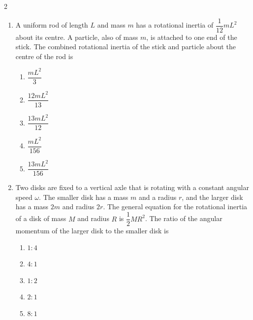 {\begin{multicols}{2}
\begin{enumerate}[leftmargin=12pt,itemsep=6pt]
    \item A uniform rod of length $L$ and mass $m$ has a rotational inertia
      of $\dfrac1{12}mL^2$ about its centre. A particle, also of mass $m$, is
      attached to one end of the stick. The combined rotational inertia of the
      stick and particle about the centre of the rod is
      \begin{center}
      \end{center}
      \begin{enumerate}
      \item$\dfrac{mL^2}3$
      \item$\dfrac{12mL^2}{13}$
      \item$\dfrac{13mL^2}{12}$
      \item$\dfrac{mL^2}{156}$
      \item$\dfrac{13mL^2}{156}$
      \end{enumerate}
    
    \item Two disks are fixed to a vertical axle that is rotating with a
      constant angular speed $\omega$. The smaller disk has a mass $m$ and a
      radius $r$, and the larger disk has a mass $2m$ and radius $2r$. The
      general equation for the rotational inertia of a disk of mass $M$ and
      radius $R$ is $\dfrac12MR^2$. The ratio of the angular momentum of the
      larger disk to the smaller disk is
      \begin{enumerate}
      \item $1:4$
      \item $4:1$
      \item $1:2$
      \item $2:1$
      \item $8:1$
      \end{enumerate}
  

\end{enumerate}
\end{multicols}}
